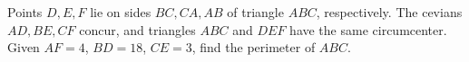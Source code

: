 Points $D,E,F$ lie on sides $BC,CA,AB$ of triangle $ABC$, respectively. The cevians $AD,BE,CF$ concur, and triangles $ABC$ and $DEF$ have the same circumcenter. Given $AF=4$, $BD=18$, $CE=3$, find the perimeter of $ABC$.
